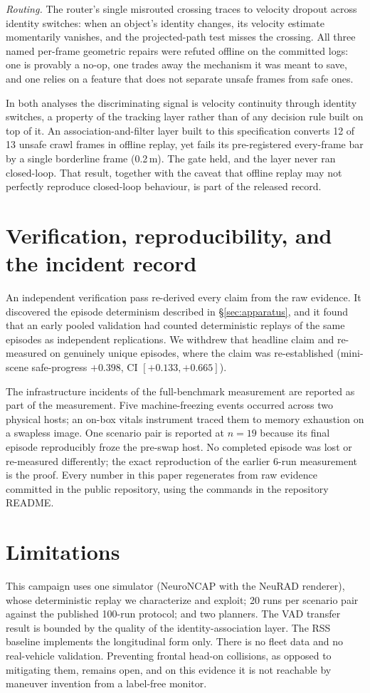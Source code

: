 \documentclass[11pt]{article}
\begin{document}
\emph{Routing.} The router's single misrouted crossing traces to velocity dropout across
identity switches: when an object's identity changes, its velocity estimate momentarily
vanishes, and the projected-path test misses the crossing. All three named per-frame geometric
repairs were refuted offline on the committed logs: one is provably a no-op, one trades away
the mechanism it was meant to save, and one relies on a feature that does not separate unsafe
frames from safe ones.

In both analyses the discriminating signal is velocity continuity through identity switches, a
property of the tracking layer rather than of any decision rule built on top of it. An
association-and-filter layer built to this specification converts 12 of 13 unsafe crawl frames
in offline replay, yet fails its pre-registered every-frame bar by a single borderline frame
(0.2\,m). The gate held, and the layer never ran closed-loop. That result, together with the
caveat that offline replay may not perfectly reproduce closed-loop behaviour, is part of the
released record.

\section{Verification, reproducibility, and the incident record}\label{sec:verif}
An independent verification pass re-derived every claim from the raw evidence. It discovered
the episode determinism described in \S\ref{sec:apparatus}, and it found that an early pooled
validation had counted deterministic replays of the same episodes as independent replications.
We withdrew that headline claim and re-measured on genuinely unique episodes, where the claim
was re-established (mini-scene safe-progress $+0.398$, CI $[+0.133, +0.665]$).

The infrastructure incidents of the full-benchmark measurement are reported as part of the
measurement. Five machine-freezing events occurred across two physical hosts; an on-box vitals
instrument traced them to memory exhaustion on a swapless image. One scenario pair is reported
at $n{=}19$ because its final episode reproducibly froze the pre-swap host. No completed
episode was lost or re-measured differently; the exact reproduction of the earlier 6-run
measurement is the proof. Every number in this paper regenerates from raw evidence committed
in the public repository, using the commands in the repository README.

\section{Limitations}
This campaign uses one simulator (NeuroNCAP with the NeuRAD renderer), whose deterministic
replay we characterize and exploit; 20 runs per scenario pair against the published 100-run
protocol; and two planners. The VAD transfer result is bounded by the quality of the
identity-association layer. The RSS baseline implements the longitudinal form only. There is
no fleet data and no real-vehicle validation. Preventing frontal head-on collisions, as
opposed to mitigating them, remains open, and on this evidence it is not reachable by maneuver
invention from a label-free monitor.
\end{document}
